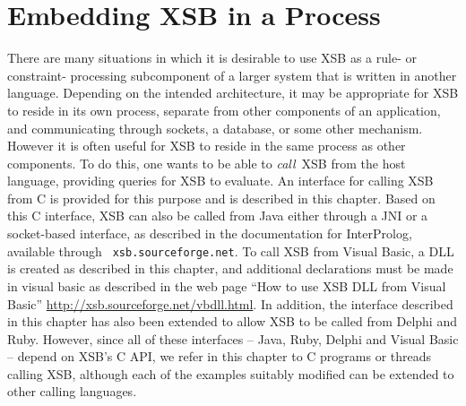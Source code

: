 \chapter{Embedding XSB in a Process}
\label{ccallingxsb}

There are many situations in which it is desirable to use XSB as a
rule- or constraint- processing subcomponent of a larger system that
is written in another language.  Depending on the intended
architecture, it may be appropriate for XSB to reside in its own
process, separate from other components of an application, and
communicating through sockets, a database, or some other mechanism.
However it is often useful for XSB to reside in the same process as
other components.  To do this, one wants to be able to {\em call}\ XSB
from the host language, providing queries for XSB to evaluate.  An
interface for calling XSB from C is provided for this purpose and is
described in this chapter.  Based on this C interface, XSB can also be
called from Java either through a JNI or a socket-based interface, as
described in the documentation for InterProlog, available through {\tt
  xsb.sourceforge.net}.  To call XSB from Visual Basic, a DLL is
created as described in this chapter, and additional declarations must
be made in visual basic as described in the web page ``How to use XSB
DLL from Visual Basic'' \url{http://xsb.sourceforge.net/vbdll.html}.
In addition, the interface described in this chapter has also been
extended to allow XSB to be called from Delphi and Ruby.  However,
since all of these interfaces -- Java, Ruby, Delphi and Visual Basic
-- depend on XSB's C API, we refer in this chapter to C programs or
threads calling XSB, although each of the examples suitably modified
can be extended to other calling languages.


